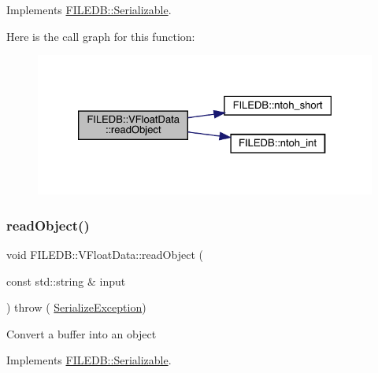 Implements \mbox{\hyperlink{classFILEDB_1_1Serializable_a21a5831fa4f65790490a8a5eba9fcab2}{F\+I\+L\+E\+D\+B\+::\+Serializable}}.

Here is the call graph for this function\+:
\nopagebreak
\begin{figure}[H]
\begin{center}
\leavevmode
\includegraphics[width=326pt]{d3/d37/classFILEDB_1_1VFloatData_ae217975cba234df3601c065669f26f38_cgraph}
\end{center}
\end{figure}
\mbox{\label{classFILEDB_1_1VFloatData_ae217975cba234df3601c065669f26f38}} 
\subsubsection{\texorpdfstring{readObject()}{readObject()}\hspace{0.1cm}{\footnotesize\ttfamily [2/2]}}
{\footnotesize\ttfamily void F\+I\+L\+E\+D\+B\+::\+V\+Float\+Data\+::read\+Object (\begin{DoxyParamCaption}\item[{const std\+::string \&}]{input }\end{DoxyParamCaption}) throw ( \mbox{\hyperlink{classFILEDB_1_1SerializeException}{Serialize\+Exception}}) \hspace{0.3cm}{\ttfamily [virtual]}}

Convert a buffer into an object 

Implements \mbox{\hyperlink{classFILEDB_1_1Serializable_a21a5831fa4f65790490a8a5eba9fcab2}{F\+I\+L\+E\+D\+B\+::\+Serializable}}.

\mbox{\label{classFILEDB_1_1VFloatData_a63b06bc5c69783fcbb4ab699b2633815}} 
